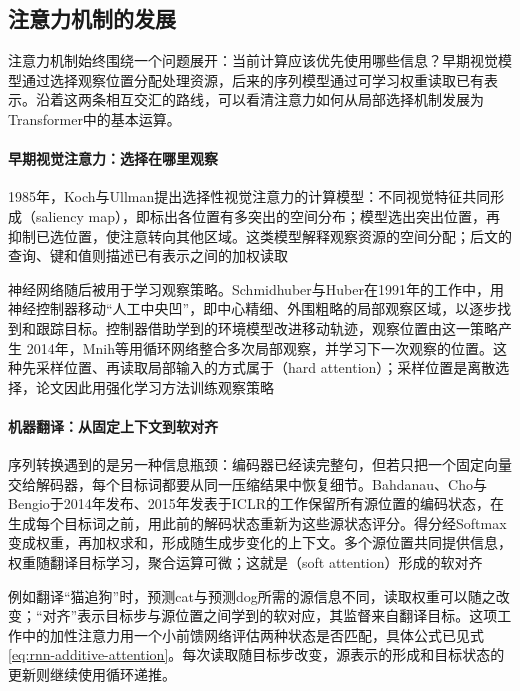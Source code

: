\subsection{注意力机制的发展}
\label{sec:transformer-attention-history}

注意力机制始终围绕一个问题展开：当前计算应该优先使用哪些信息？早期视觉模型通过选择观察位置分配处理资源，后来的序列模型通过可学习权重读取已有表示。沿着这两条相互交汇的路线，可以看清注意力如何从局部选择机制发展为Transformer中的基本运算。

\paragraph{早期视觉注意力：选择在哪里观察}
1985年，Koch与Ullman提出选择性视觉注意力的计算模型：不同视觉特征共同形成（saliency map），即标出各位置有多突出的空间分布；模型选出突出位置，再抑制已选位置，使注意转向其他区域。这类模型解释观察资源的空间分配；后文的查询、键和值则描述已有表示之间的加权读取

神经网络随后被用于学习观察策略。Schmidhuber与Huber在1991年的工作中，用神经控制器移动“人工中央凹”，即中心精细、外围粗略的局部观察区域，以逐步找到和跟踪目标。控制器借助学到的环境模型改进移动轨迹，观察位置由这一策略产生 2014年，Mnih等用循环网络整合多次局部观察，并学习下一次观察的位置。这种先采样位置、再读取局部输入的方式属于（hard attention）；采样位置是离散选择，论文因此用强化学习方法训练观察策略

\paragraph{机器翻译：从固定上下文到软对齐}
序列转换遇到的是另一种信息瓶颈：编码器已经读完整句，但若只把一个固定向量交给解码器，每个目标词都要从同一压缩结果中恢复细节。Bahdanau、Cho与Bengio于2014年发布、2015年发表于ICLR的工作保留所有源位置的编码状态，在生成每个目标词之前，用此前的解码状态重新为这些源状态评分。得分经Softmax变成权重，再加权求和，形成随生成步变化的上下文。多个源位置共同提供信息，权重随翻译目标学习，聚合运算可微；这就是（soft attention）形成的软对齐

例如翻译“猫追狗”时，预测cat与预测dog所需的源信息不同，读取权重可以随之改变；“对齐”表示目标步与源位置之间学到的软对应，其监督来自翻译目标。这项工作中的加性注意力用一个小前馈网络评估两种状态是否匹配，具体公式已见式\eqref{eq:rnn-additive-attention}。每次读取随目标步改变，源表示的形成和目标状态的更新则继续使用循环递推。


